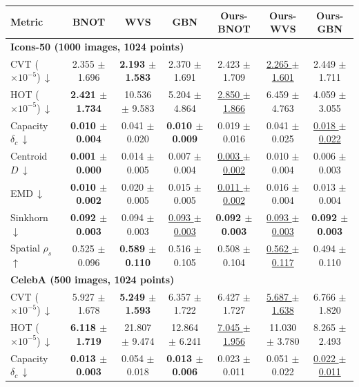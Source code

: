 \begin{table}[b]
\centering
\small
\setlength{\tabcolsep}{4pt}
\renewcommand{\arraystretch}{1.2}
\begin{tabular}{|l|c|c|c|c|c|c|}
\hline
\textbf{Metric} & BNOT & WVS & GBN & \textbf{Ours-BNOT} & \textbf{Ours-WVS} & \textbf{Ours-GBN} \\
\hline
\multicolumn{7}{|l|}{\textbf{Icons-50 (1000 images, 1024 points)}} \\
\hline
CVT ($\times 10^{-5}$)\,$\downarrow$ & 2.355 $\pm$ 1.696 & \textbf{2.193 $\pm$ 1.583} & 2.370 $\pm$ 1.691 & 2.423 $\pm$ 1.709 & \underline{2.265 $\pm$ 1.601} & 2.449 $\pm$ 1.711 \\
HOT ($\times 10^{-5}$)\,$\downarrow$ & \textbf{2.421 $\pm$ 1.734} & 10.536 $\pm$ 9.583 & 5.204 $\pm$ 4.864 & \underline{2.850 $\pm$ 1.866} & 6.459 $\pm$ 4.763 & 4.059 $\pm$ 3.055 \\
Capacity $\delta_c$\,$\downarrow$ & \textbf{0.010 $\pm$ 0.004} & 0.041 $\pm$ 0.020 & \textbf{0.010 $\pm$ 0.009} & 0.019 $\pm$ 0.016 & 0.041 $\pm$ 0.025 & \underline{0.018 $\pm$ 0.022} \\
Centroid $D$\,$\downarrow$ & \textbf{0.001 $\pm$ 0.000} & 0.014 $\pm$ 0.005 & 0.007 $\pm$ 0.004 & \underline{0.003 $\pm$ 0.002} & 0.010 $\pm$ 0.004 & 0.006 $\pm$ 0.003 \\
EMD\,$\downarrow$ & \textbf{0.010 $\pm$ 0.002} & 0.020 $\pm$ 0.005 & 0.015 $\pm$ 0.005 & \underline{0.011 $\pm$ 0.002} & 0.016 $\pm$ 0.004 & 0.013 $\pm$ 0.004 \\
Sinkhorn\,$\downarrow$ & \textbf{0.092 $\pm$ 0.003} & 0.094 $\pm$ 0.003 & \underline{0.093 $\pm$ 0.003} & \textbf{0.092 $\pm$ 0.003} & \underline{0.093 $\pm$ 0.003} & \textbf{0.092 $\pm$ 0.003} \\
Spatial $\rho_s$\,$\uparrow$ & 0.525 $\pm$ 0.096 & \textbf{0.589 $\pm$ 0.110} & 0.516 $\pm$ 0.105 & 0.508 $\pm$ 0.104 & \underline{0.562 $\pm$ 0.117} & 0.494 $\pm$ 0.110 \\
\hline
\multicolumn{7}{|l|}{\textbf{CelebA (500 images, 1024 points)}} \\
\hline
CVT ($\times 10^{-5}$)\,$\downarrow$ & 5.927 $\pm$ 1.678 & \textbf{5.249 $\pm$ 1.593} & 6.357 $\pm$ 1.722 & 6.427 $\pm$ 1.727 & \underline{5.687 $\pm$ 1.638} & 6.766 $\pm$ 1.820 \\
HOT ($\times 10^{-5}$)\,$\downarrow$ & \textbf{6.118 $\pm$ 1.719} & 21.807 $\pm$ 9.474 & 12.864 $\pm$ 6.241 & \underline{7.045 $\pm$ 1.956} & 11.030 $\pm$ 3.780 & 8.265 $\pm$ 2.493 \\
Capacity $\delta_c$\,$\downarrow$ & \textbf{0.013 $\pm$ 0.003} & 0.054 $\pm$ 0.018 & \textbf{0.013 $\pm$ 0.006} & 0.023 $\pm$ 0.011 & 0.051 $\pm$ 0.022 & \underline{0.022 $\pm$ 0.011} \\

\end{tabular}
\end{table}
